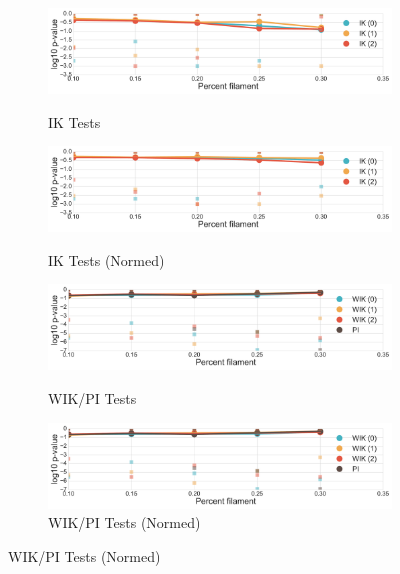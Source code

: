 \documentclass[12pt]{article}
\begin{document}
\begin{center}
\begin{figure}[htp!]
\begin{subfigure}{.45\textwidth}
      \label{fig:sub_silh_normed}
    \end{subfigure}
    \begin{subfigure}{.45\textwidth}
      \centering
      \caption{IK Tests}
      \includegraphics[width=\linewidth]{figure_8_contour_group.pdf}
      \label{fig:sub_contour}
    \end{subfigure}
    \begin{subfigure}{.45\textwidth}
      \centering
      \caption{IK Tests (Normed)}
      \includegraphics[width=\linewidth]{figure_8_contour_group_normed.pdf}
      \label{fig:sub_contour_normed}
    \end{subfigure}
    \begin{subfigure}{.45\textwidth}
      \centering
      \caption{WIK/PI Tests}
      \includegraphics[width=\linewidth]{figure_8_weighted_contour_group.pdf}
      \label{fig:sub_weight}
    \end{subfigure}
    \begin{subfigure}{.45\textwidth}
      \centering
      \caption{WIK/PI Tests (Normed)}
      \includegraphics[width=\linewidth]{figure_8_weighted_contour_group_normed.pdf}

\end{subfigure}
\end{figure}
\end{center}
\end{document}

